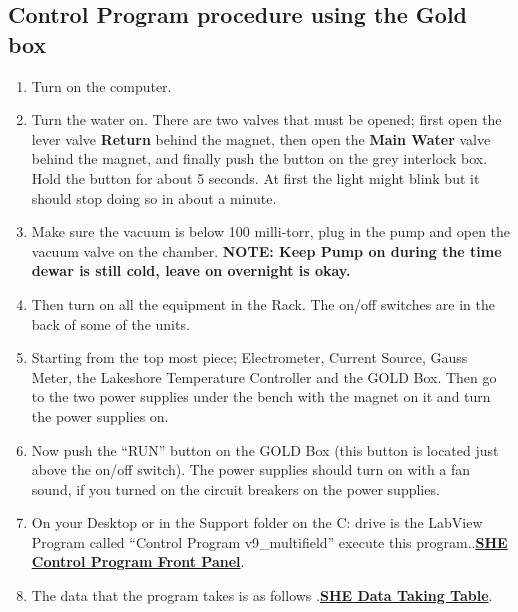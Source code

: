 \documentclass{../lab}
\begin{document}
\subsection{Control Program procedure using the Gold box}

\begin{enumerate}
    \item Turn on the computer.

    \item Turn the water on. There are two valves that must be opened; first open the lever valve \textbf{Return} behind the magnet, then open the \textbf{Main Water} valve behind the magnet, and finally push the button on the grey interlock box. Hold the button for about 5 seconds. At first the light might blink but it should stop doing so in about a minute.

    \item Make sure the vacuum is below 100 milli-torr, plug in the pump and open the vacuum valve on the chamber. \textbf{NOTE: Keep Pump on during the time dewar is still cold, leave on overnight is okay.}

    \item Then turn on all the equipment in the Rack. The on/off switches are in the back of some of the units.

    \item Starting from the top most piece; Electrometer, Current Source, Gauss Meter, the Lakeshore Temperature Controller and the GOLD Box. Then go to the two power supplies under the bench with the magnet on it and turn the power supplies on.

    \item Now push the ``RUN'' button on the GOLD Box (this button is located just above the on/off switch). The power supplies should turn on with a fan sound, if you turned on the circuit breakers on the power supplies.

    \item On your Desktop or in the Support folder on the C: drive is the LabView Program called ``Control Program v9\_multifield'' execute this program..\href{http://experimentationlab.berkeley.edu/sites/default/files/images/SHE\_FrontPanel.pdf}{\textbf{SHE Control Program Front Panel}}.

    \item The data that the program takes is as follows .\href{http://experimentationlab.berkeley.edu/sites/default/files/images/SHE\_Data\_Taking\_Table.pdf}{\textbf{SHE Data Taking Table}}.


\end{enumerate}
\end{document}
